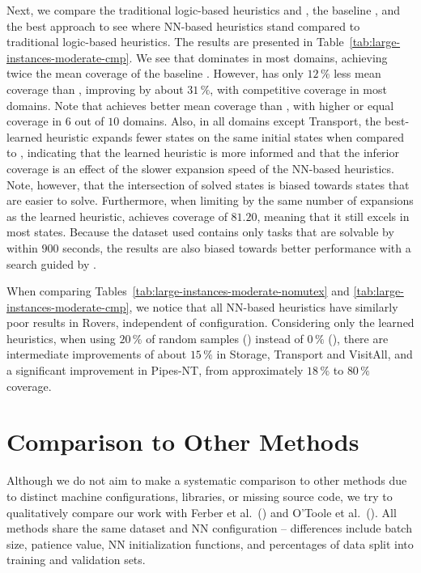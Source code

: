Next, we compare the traditional logic-based heuristics \hff and \hgc, the baseline \hnnbase, and the best approach \hnnrs to see where NN-based heuristics stand compared to traditional logic-based heuristics. The results are presented in Table~\ref{tab:large-instances-moderate-cmp}.
We see that \hff dominates in most domains, achieving twice the mean coverage of the baseline \hnnbase. However, \hnnrs has only $12\,\%$ less mean coverage than \hff, improving \hnnbase by about $31\,\%$, with competitive coverage in most domains. Note that \hnnrs achieves better mean coverage than \hgc, with higher or equal coverage in $6$ out of $10$ domains. Also, in all domains except Transport, the best-learned heuristic expands fewer states on the same initial states when compared to \hff, indicating that the learned heuristic is more informed and that the inferior coverage is an effect of the slower expansion speed of the NN-based heuristics. Note, however, that the intersection of solved states is biased towards states that are easier to solve. Furthermore, when limiting \hff by the same number of expansions as the learned heuristic, \hff achieves coverage of $81.20$, meaning that it still excels in most states. Because the dataset used contains only tasks that are solvable by \hff within $900$ seconds, the results are also biased towards better performance with a search guided by \hff. 



When comparing Tables~\ref{tab:large-instances-moderate-nomutex} and \ref{tab:large-instances-moderate-cmp}, we notice that all NN-based heuristics have similarly poor results in Rovers, independent of configuration. Considering only the learned heuristics, when using $20\,\%$ of random samples (\hnnrs) instead of $0\,\%$ (\hnnbfsrwl{\meanfx}), there are intermediate improvements of about $15\,\%$ in Storage, Transport and VisitAll, and a significant improvement in Pipes-NT, from approximately $18\,\%$ to $80\,\%$ coverage.

\section{Comparison to Other Methods}
\label{sec:comparison}

Although we do not aim to make a systematic comparison to other methods due to distinct machine configurations, libraries, or missing source code, we try to qualitatively compare our work with Ferber et al.~(\citeyear{Ferber.etal/2022}) and O'Toole et al.~(\citeyear{OToole/2022}). All methods share the same dataset and NN configuration -- differences include batch size, patience value, NN initialization functions, and percentages of data split into training and validation sets.

